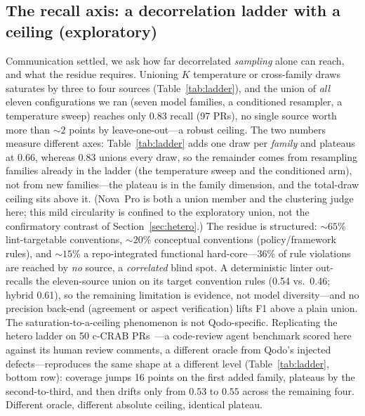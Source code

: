\documentclass[conference]{IEEEtran}
\begin{document}
\subsection{The recall axis: a decorrelation ladder with a ceiling (exploratory)}
\label{sec:ceiling}
Communication settled, we ask how far decorrelated \emph{sampling} alone can
reach, and what the residue requires. Unioning $K$ temperature or cross-family
draws saturates by three to four sources (Table~\ref{tab:ladder}), and the union of
\emph{all} eleven configurations we ran (seven model families, a conditioned
resampler, a temperature sweep) reaches only 0.83 recall (97 PRs), no single
source worth more than ${\sim}2$ points by leave-one-out---a robust ceiling. The
two numbers measure different axes: Table~\ref{tab:ladder} adds one draw per
\emph{family} and plateaus at 0.66, whereas 0.83 unions every draw, so the
remainder comes from resampling families already in the ladder (the temperature
sweep and the conditioned arm), not from new families---the plateau is in the
family dimension, and the total-draw ceiling sits above it.
(Nova~Pro is both a union member and the clustering judge here; this mild
circularity is confined to the exploratory union, not the confirmatory contrast
of Section~\ref{sec:hetero}.) The residue is structured: ${\sim}65\%$
lint-targetable conventions, ${\sim}20\%$ conceptual conventions
(policy/framework rules), and ${\sim}15\%$ a repo-integrated functional
hard-core---36\% of rule violations are reached by \emph{no} source, a
\emph{correlated} blind spot. A deterministic linter out-recalls the eleven-source union
on its target convention rules (0.54 vs.\ 0.46; hybrid 0.61), so the remaining
limitation is evidence, not model diversity---and no precision back-end
(agreement or aspect verification) lifts F1 above a plain union. The
saturation-to-a-ceiling phenomenon is not Qodo-specific. Replicating the hetero
ladder on 50 c-CRAB PRs~\cite{crab}---a code-review agent benchmark scored here
against its human review comments, a different oracle from Qodo's injected
defects---reproduces the same shape at a different level
(Table~\ref{tab:ladder}, bottom row): coverage jumps 16 points on the first
added family, plateaus by the second-to-third, and then drifts only from $0.53$
to $0.55$ across the remaining four. Different oracle, different absolute
ceiling, identical plateau.
\end{document}
